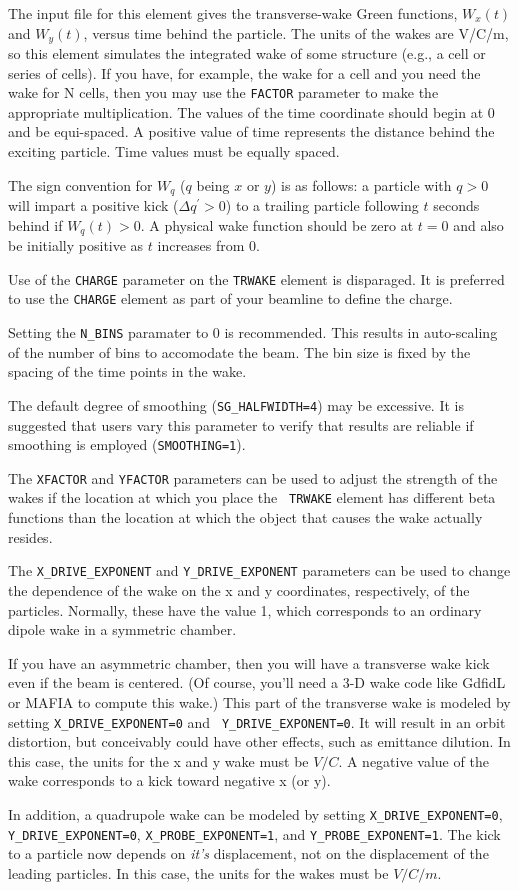 The input file for this element gives the transverse-wake Green
functions, $W_x(t)$ and $W_y(t)$, versus time behind the particle. The
units of the wakes are V/C/m, so this element simulates the integrated
wake of some structure (e.g., a cell or series of cells).  If you
have, for example, the wake for a cell and you need the wake for N
cells, then you may use the {\tt FACTOR} parameter to make the
appropriate multiplication.  The values of the time coordinate should
begin at 0 and be equi-spaced.  A positive value of time represents
the distance behind the exciting particle.   Time values must be equally
spaced.

The sign convention for $W_q$ ($q$ being $x$ or $y$) is as follows: a
particle with $q>0$ will impart a positive kick ($\Delta q^\prime >
0$) to a trailing particle following $t$ seconds behind if $W_q(t)>0$.
A physical wake function should be zero at $t=0$ and also be initially
positive as $t$ increases from 0.

Use of the {\tt CHARGE} parameter on the {\tt TRWAKE} element is
disparaged.  It is preferred to use the {\tt CHARGE} element as part
of your beamline to define the charge.  

Setting the {\tt N\_BINS} paramater to 0 is recommended.  This results
in auto-scaling of the number of bins to accomodate the beam.  The bin
size is fixed by the spacing of the time points in the wake.

The default degree of smoothing ({\tt SG\_HALFWIDTH=4}) may be excessive.
It is suggested that users vary this parameter to verify that results
are reliable if smoothing is employed ({\tt SMOOTHING=1}).

The {\tt XFACTOR} and {\tt YFACTOR} parameters can be used to adjust
the strength of the wakes if the location at which you place the {\tt
TRWAKE} element has different beta functions than the location at
which the object that causes the wake actually resides.  

The {\tt X\_DRIVE\_EXPONENT} and {\tt Y\_DRIVE\_EXPONENT} parameters can be used to change the
dependence of the wake on the x and y coordinates, respectively, of the particles.  
Normally, these have the value 1, which corresponds to 
an ordinary dipole wake in a symmetric chamber.  

If you have an asymmetric chamber, then you will have a transverse
wake kick even if the beam is centered.  (Of course, you'll need a 3-D
wake code like GdfidL or MAFIA to compute this wake.)  This part of
the transverse wake is modeled by setting {\tt X\_DRIVE\_EXPONENT=0} and {\tt
Y\_DRIVE\_EXPONENT=0}.  It will result in an orbit distortion, but conceivably
could have other effects, such as emittance dilution.  In this case, 
the units for the x and y wake must be $V/C$.  A negative value of the wake
corresponds to a kick toward negative x (or y).

In addition, a quadrupole wake can be modeled by setting {\tt X\_DRIVE\_EXPONENT=0}, {\tt
Y\_DRIVE\_EXPONENT=0}, {\tt X\_PROBE\_EXPONENT=1}, and {\tt Y\_PROBE\_EXPONENT=1}.
The kick to a particle now depends on {\em it's} displacement, not on the displacement of
the leading particles.
In this case, the units for the wakes must be $V/C/m$.
